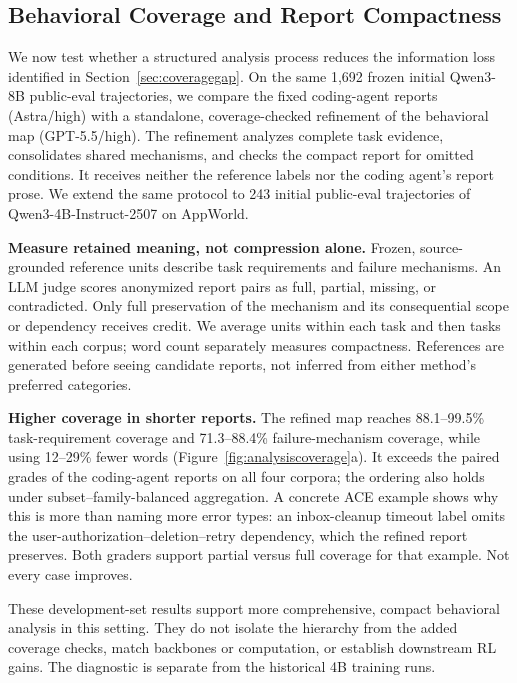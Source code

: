 \subsection{Behavioral Coverage and Report Compactness}
\label{sec:analysiscoverage}



We now test whether a structured analysis process reduces the information loss
identified in Section~\ref{sec:coveragegap}. On the same 1,692 frozen initial
Qwen3-8B public-eval trajectories, we compare the fixed coding-agent reports
(Astra/high) with a standalone, coverage-checked refinement of the behavioral
map (GPT-5.5/high). The refinement analyzes complete task evidence, consolidates
shared mechanisms, and checks the compact report for omitted conditions. It
receives neither the reference labels nor the coding agent's report prose.
We extend the same protocol to 243 initial public-eval trajectories of
Qwen3-4B-Instruct-2507 on AppWorld.

\textbf{Measure retained meaning, not compression alone.}\quad
Frozen, source-grounded reference units describe task requirements and failure
mechanisms. An LLM judge scores anonymized report pairs as full, partial,
missing, or contradicted. Only full preservation of the mechanism and its
consequential scope or dependency receives credit. We average units within
each task and then tasks within each corpus; word count separately measures
compactness. References are generated before seeing candidate reports, not
inferred from either method's preferred categories.

\textbf{Higher coverage in shorter reports.}\quad
The refined map reaches 88.1--99.5\% task-requirement coverage and 71.3--88.4\%
failure-mechanism coverage, while using 12--29\% fewer words
(Figure~\ref{fig:analysiscoverage}a). It exceeds the paired
grades of the coding-agent reports on all four corpora; the ordering
also holds under subset--family-balanced aggregation. A concrete ACE example
shows why this is more than naming more error types: an inbox-cleanup timeout
label omits the user-authorization--deletion--retry dependency, which the
refined report preserves. Both graders support partial versus full coverage
for that example. Not every case improves.

These development-set results support more comprehensive, compact behavioral
analysis in this setting. They do not isolate the hierarchy from the added
coverage checks, match backbones or computation, or establish downstream RL
gains. The diagnostic is separate from the historical 4B training runs.
